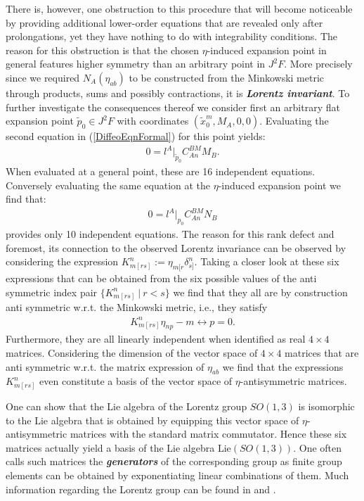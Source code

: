 There is, however, one obstruction to this procedure that will become noticeable by providing additional lower-order equations that are revealed only after prolongations, yet they have nothing to do with integrability conditions. 
The reason for this obstruction is that the chosen $\eta$-induced expansion point in general features higher symmetry than an arbitrary point in $J^2F$. More precisely since we required $N_A(\eta_{ab})$ to be constructed from the Minkowski metric through products, sums and possibly contractions, it is \textit{\textbf{Lorentz invariant}}. To further investigate the consequences thereof we consider first an arbitrary flat expansion point $\tilde{p}_0 \in J^2F$ with coordinates $(\tilde{x}_0^m,M_A,0,0)$. Evaluating the second equation in (\ref{DiffeoEqnFormal}) for this point yields:
\begin{align}
    0 = l^A \vert _{\tilde{p}_0} C^{BM}_{An}M_B.
\end{align}
When evaluated at a general point, these are 16 independent equations. 
Conversely evaluating the same equation at the $\eta$-induced expansion point we find that:
\begin{align}\label{RankDef}
    0 = l^A \vert_{p_0} C^{BM}_{An}N_B
\end{align}
provides only 10 independent equations. The reason for this rank defect and foremost, its connection to the observed Lorentz invariance can be observed by considering the expression $K_{m[rs]}^n :=\eta_{m[r}\delta_{s]}^n$. 
Taking a closer look at these six expressions that can be obtained from the six possible values of the anti symmetric index pair  $\{K_{m[rs]}^n \ \vert \ r < s \} $ we find that they all are by construction anti symmetric w.r.t. the Minkowski metric, i.e., they satisfy 
\begin{align}
K_{m[rs]}^n\eta_{n p} - m \leftrightarrow p = 0.
\end{align}
Furthermore, they are all linearly independent when identified as real $4 \times 4$ matrices. Considering the dimension of the vector space of $4 \times 4$ matrices that are anti symmetric w.r.t. the matrix expression of $\eta_{ab}$ we find that  the expressions $K_{m[rs]}^n$ even constitute a basis of the vector space of $\eta$-antisymmetric matrices. 

One can show that the Lie algebra of the Lorentz group $SO(1,3)$ is isomorphic to the Lie algebra that is obtained by equipping this vector space of $\eta$-antisymmetric matrices with the standard matrix commutator. Hence these six matrices actually yield a basis of the Lie algebra $\mathrm{Lie}(SO(1,3))$. One often calls such matrices the \textit{\textbf{generators}} of the corresponding group as finite group elements can be obtained by exponentiating linear combinations of them. Much information regarding the Lorentz group can be found in \cite{doi:10.1142/p199} and \cite{naimark2014linear}.

